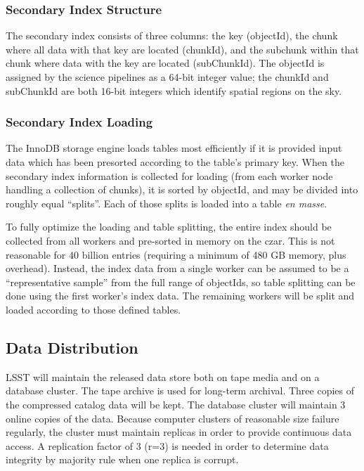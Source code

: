 \documentclass[DM,lsstdraft,toc]{lsstdoc}
\begin{document}
\subsubsection{Secondary Index
Structure}\label{secondary-index-structure}

The secondary index consists of three columns: the key (objectId), the
chunk where all data with that key are located (chunkId), and the
subchunk within that chunk where data with the key are located
(subChunkId). The objectId is assigned by the science pipelines as a
64-bit integer value; the chunkId and subChunkId are both 16-bit
integers which identify spatial regions on the sky.

\subsubsection{Secondary Index Loading}\label{secondary-index-loading}

The InnoDB storage engine loads tables most efficiently if it is
provided input data which has been presorted according to the table's
primary key. When the secondary index information is collected for
loading (from each worker node handling a collection of chunks), it is
sorted by objectId, and may be divided into roughly equal ``splits''.
Each of those splits is loaded into a table \emph{en masse}.

To fully optimize the loading and table splitting, the entire index
should be collected from all workers and pre-sorted in memory on the
czar. This is not reasonable for 40 billion entries (requiring a minimum
of 480 GB memory, plus overhead). Instead, the index data from a single
worker can be assumed to be a ``representative sample'' from the full
range of objectIds, so table splitting can be done using the first
worker's index data. The remaining workers will be split and loaded
according to those defined tables.

\subsection{Data Distribution}\label{data-distribution}

LSST will maintain the released data store both on tape media and on a
database cluster. The tape archive is used for long-term archival. Three
copies of the compressed catalog data will be kept. The database cluster
will maintain 3 online copies of the data. Because computer clusters of
reasonable size failure regularly, the cluster must maintain replicas in
order to provide continuous data access. A replication factor of 3 (r=3)
is needed in order to determine data integrity by majority rule when one
replica is corrupt.
\end{document}
